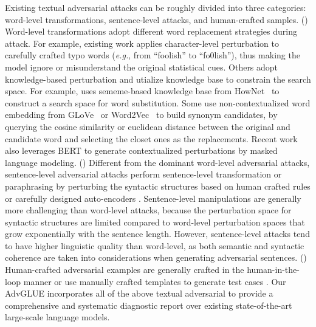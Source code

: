 \documentclass{article}
\newcommand{\method}{AdvGLUE\xspace}
\begin{document}
Existing textual adversarial attacks can be roughly divided into three categories: word-level transformations, sentence-level attacks, and human-crafted samples. () Word-level transformations adopt different word replacement strategies during attack. For example, existing work \citep{textbugger, hotflip} applies character-level perturbation to carefully crafted typo words (\emph{e.g.}, from ``foolish'' to ``fo0lish''), thus making the model ignore or misunderstand the original statistical cues.  Others adopt knowledge-based perturbation and utialize knowledge base to constrain the search space. For example, \citet{comattack} uses sememe-based knowledge base from HowNet~\citep{hownet} to construct a search space for word substitution. Some \citep{textfooler, textbugger}  use non-contextualized word embedding from  GLoVe~\citep{DBLP:conf/emnlp/PenningtonSM14} or Word2Vec~\citep{DBLP:conf/nips/MikolovSCCD13} to build synonym candidates, by querying the cosine similarity or euclidean distance between the original and candidate word and selecting the closet ones as the replacements. Recent work \citep{bae,
bertattack} also leverages BERT to generate contextualized perturbations by masked language modeling. 
() Different from the dominant word-level adversarial attacks, sentence-level adversarial attacks perform sentence-level transformation or paraphrasing by perturbing the syntactic structures based on human crafted rules \citep{stresstest, checklist} or carefully designed auto-encoders \citep{scpn, t3}.  Sentence-level manipulations are generally more challenging than word-level attacks, because the perturbation space for syntactic structures are limited compared to word-level perturbation spaces that grow exponentially with the sentence length. However, sentence-level attacks tend to have higher linguistic quality than word-level, as both semantic and syntactic coherence are taken into considerations when generating adversarial sentences.
() Human-crafted adversarial examples are generally crafted in the human-in-the-loop manner \citep{advsquad,anli,dynabenchqa} or use manually crafted templates to generate test cases \citep{stresstest,checklist}. Our \method incorporates all of the above textual adversarial to provide a comprehensive and systematic diagnostic report over existing state-of-the-art large-scale language models.
\end{document}
